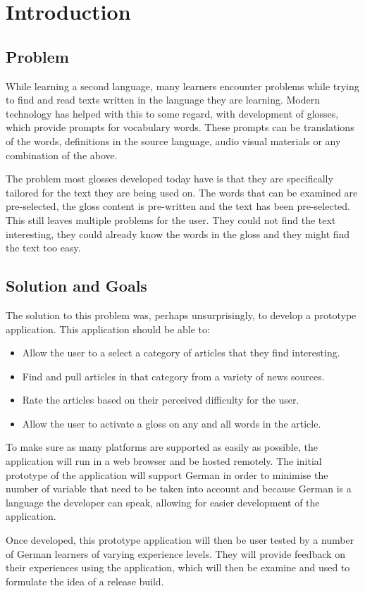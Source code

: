 \chapter{Introduction}

\section{Problem}
While learning a second language, many learners encounter problems while trying to find and read texts written in the language they are learning. Modern technology has helped with this to some regard, with development of glosses, which provide prompts for vocabulary words. These prompts can be translations of the words, definitions in the source language, audio visual materials or any combination of the above. 

The problem most glosses developed today have is that they are specifically tailored for the text they are being used on. The words that can be examined are pre-selected, the gloss content is pre-written and the text has been pre-selected. This still leaves multiple problems for the user. They could not find the text interesting, they could already know the words in the gloss and they might find the text too easy. 

\section{Solution and Goals}

The solution to this problem was, perhaps unsurprisingly, to develop a prototype application. This application should be able to:

\begin{itemize}
	\item Allow the user to a select a category of articles that they find interesting.
	
	\item Find and pull articles in that category from a variety of news sources.
	
	\item Rate the articles based on their perceived difficulty for the user.
	
	\item Allow the user to activate a gloss on any and all words in the article. 
\end{itemize}

To make sure as many platforms are supported as easily as possible, the application will run in a web browser and be hosted remotely. The initial prototype of the application will support German in order to minimise the number of variable that need to be taken into account and because German is a language the developer can speak, allowing for easier development of the application.

Once developed, this  prototype application will then be user tested by a number of German learners of varying experience levels. They will provide feedback on their experiences using the application, which will then be examine and used to formulate the idea of a release build. 